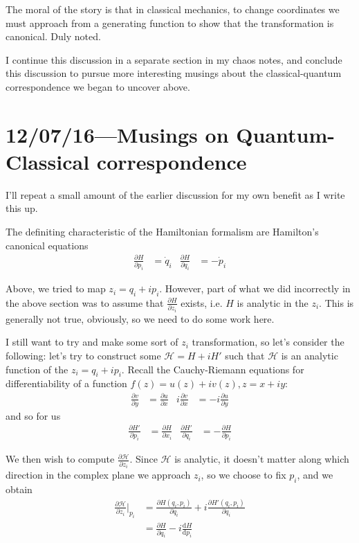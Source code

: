 \documentclass[10pt]{article}
\newcommand{\rd}[2]{\frac{\mathrm{d}#1}{\mathrm{d}#2}}
\newcommand{\pd}[2]{\frac{\partial#1}{\partial#2}}
\begin{document}
The moral of the story is that in classical mechanics, to change coordinates we
must approach from a generating function to show that the transformation is
canonical. Duly noted.

I continue this discussion in a separate section in my chaos notes, and conclude
this discussion to pursue more interesting musings about the classical-quantum
correspondence we began to uncover above.

\clearpage

\section{12/07/16---Musings on Quantum-Classical correspondence}

I'll repeat a small amount of the earlier discussion for my own benefit as I
write this up.

The definiting characteristic of the Hamiltonian formalism are Hamilton's
canonical equations
\begin{align}
    \pd{H}{p_i} &= \dot{q}_i & \pd{H}{q_i} &= -\dot{p}_i
\end{align}

Above, we tried to map $z_i = q_i + ip_i$. However, part of what we did
incorrectly in the above section was to assume that $\pd{H}{z_i}$ exists, i.e.
$H$ is analytic in the $z_i$. This is generally not true, obviously, so we need
to do some work here.

I still want to try and make some sort of $z_i$ transformation, so let's
consider the following: let's try to construct some $\mathcal{H} = H + iH'$ such
that $\mathcal{H}$ is an analytic function of the $z_i = q_i + ip_i$. Recall the
Cauchy-Riemann equations for differentiability of a function $f(z) = u(z) +
iv(z), z = x + iy$:
\begin{align}
    \pd{v}{y} &= \pd{u}{x}& i\pd{v}{x} &= -i\pd{u}{y}
\end{align}
and so for us
\begin{align}
    \pd{H'}{p_i} &= \pd{H}{x_i}& \pd{H'}{q_i} &= -\pd{H}{p_i}
\end{align}

We then wish to compute $\pd{\mathcal{H}}{z_i}$. Since $\mathcal{H}$ is
analytic, it doesn't matter along which direction in the complex plane we
approach $z_i$, so we choose to fix $p_i$, and we obtain
\begin{align}
    \pd{\mathcal{H}}{z_i}\Bigg|_{p_i} &=
        \pd{H(q_i, p_i)}{q_i} + i\pd{H'(q_i, p_i)}{q_i}\\
        &= \pd{H}{q_i} - i\rd{H}{p_i}
\end{align}
\end{document}
